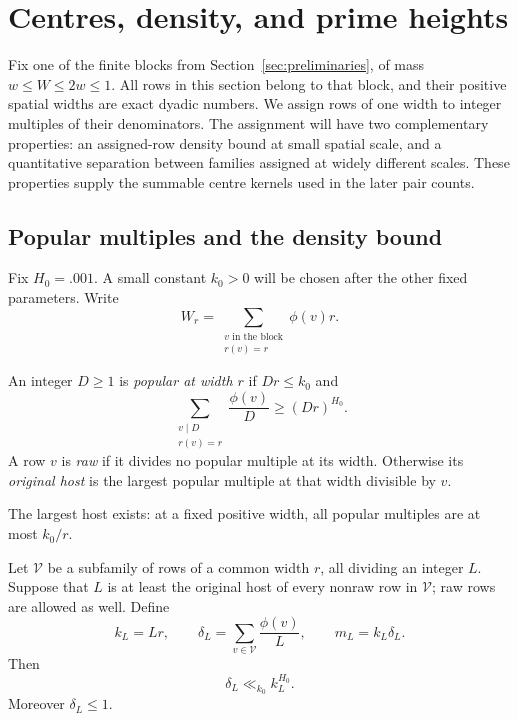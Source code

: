 \section{Centres, density, and prime heights}
\label{sec:centres}

Fix one of the finite blocks from Section~\ref{sec:preliminaries}, of
mass $w\le W\le 2w\le1$. All rows in this section belong to that block,
and their positive spatial widths are exact dyadic numbers. We assign
rows of one width to integer multiples of their denominators. The
assignment will have two complementary properties: an assigned-row
density bound at small spatial scale, and a quantitative separation between families
assigned at widely different scales. These properties supply the
summable centre kernels used in the later pair counts.

\subsection{Popular multiples and the density bound}

Fix $H_0=.001$. A small constant $k_0>0$ will be chosen after the other
fixed parameters. Write
\[
 W_r=\sum_{\substack{v\text{ in the block}\\r(v)=r}}\phi(v)r.
\]

\begin{definition}
\label{cen:popular}
An integer $D\ge1$ is \emph{popular at width $r$} if $Dr\le k_0$ and
\[
 \sum_{\substack{v\mid D\\r(v)=r}}\frac{\phi(v)}D
 \ge (Dr)^{H_0}.
\]
A row $v$ is \emph{raw} if it divides no popular multiple at its width.
Otherwise its \emph{original host} is the largest popular multiple at
that width divisible by $v$.
\end{definition}

The largest host exists: at a fixed positive width, all popular
multiples are at most $k_0/r$.

\begin{lemma}
\label{cen:density}
Let $\mathcal V$ be a subfamily of rows of a common width $r$, all
dividing an integer $L$. Suppose that $L$ is at least the original host
of every nonraw row in $\mathcal V$; raw rows are allowed as well. Define
\[
 k_L=Lr,\qquad
 \delta_L=\sum_{v\in\mathcal V}\frac{\phi(v)}L,\qquad
 m_L=k_L\delta_L.
\]
Then
\begin{equation}
 \delta_L\ll_{k_0} k_L^{H_0}.
 \label{eq:centre-density}
\end{equation}
Moreover $\delta_L\le1$.
\end{lemma}


